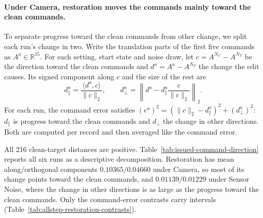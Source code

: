 \paragraph{Under Camera, restoration moves the commands mainly toward the clean commands.}
To separate progress toward the clean commands from other change, we split each run's change in two. Write the translation parts of the first five commands as $A^a\in\mathbb R^{15}$. For each setting, start state and noise draw, let $c=A^{N_C}-A^{N_T}$ be the direction toward the clean commands and $d^a=A^a-A^{N_T}$ the change the edit causes. Its signed component along $c$ and the size of the rest are
\begin{equation}
 d_\parallel^a=\frac{\langle d^a,c\rangle}{\|c\|_2},
 \qquad
 d_\perp^a=\left\|d^a-d_\parallel^a\frac{c}{\|c\|_2}\right\|_2.
 \label{eq:issued-command-direction}
\end{equation}
For each run, the command error satisfies $(e^a)^2=(\|c\|_2-d_\parallel^a)^2+(d_\perp^a)^2$: $d_\parallel$ is progress toward the clean commands and $d_\perp$ the change in other directions. Both are computed per record and then averaged like the command error.

All 216 clean-target distances are positive. Table~\ref{tab:issued-command-direction} reports all six runs as a descriptive decomposition. Restoration has mean along/orthogonal components $0.10365/0.04660$ under Camera, so most of its change points toward the clean commands, and $0.01139/0.01229$ under Sensor Noise, where the change in other directions is as large as the progress toward the clean commands. Only the command-error contrasts carry intervals (Table~\ref{tab:allstep-restoration-contrasts}).


